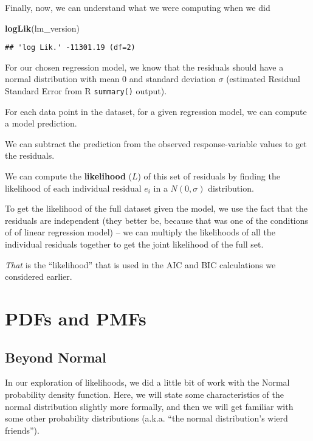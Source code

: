 \documentclass[]{book}
\newenvironment{Shaded}{\begin{snugshade}}{\end{snugshade}}
\newcommand{\KeywordTok}[1]{\textcolor[rgb]{0.13,0.29,0.53}{\textbf{#1}}}
\newcommand{\NormalTok}[1]{#1}
\begin{document}
Finally, now, we can understand what we were computing when we did

\begin{Shaded}
\begin{Highlighting}[]
\KeywordTok{logLik}\NormalTok{(lm_version)}
\end{Highlighting}
\end{Shaded}

\begin{verbatim}
## 'log Lik.' -11301.19 (df=2)
\end{verbatim}

For our chosen regression model, we know that the residuals should have a normal distribution with mean 0 and standard deviation \(\sigma\) (estimated Residual Standard Error from R \texttt{summary()} output).

For each data point in the dataset, for a given regression model, we can compute a model prediction.

We can subtract the prediction from the observed response-variable values to get the residuals.

We can compute the \textbf{likelihood} (\(L\)) of this set of residuals by finding the likelihood of each individual residual \(e_i\) in a \(N(0, \sigma)\) distribution.

To get the likelihood of the full dataset given the model, we use the fact that the residuals are independent (they better be, because that was one of the conditions of of linear regression model) -- we can multiply the likelihoods of all the individual residuals together to get the joint likelihood of the full set.

\emph{That} is the ``likelihood'' that is used in the AIC and BIC calculations we considered earlier.

\hypertarget{pdfs-and-pmfs}{%
\chapter{PDFs and PMFs}\label{pdfs-and-pmfs}}

\hypertarget{beyond-normal}{%
\section{Beyond Normal}\label{beyond-normal}}

In our exploration of likelihoods, we did a little bit of work with the Normal probability density function. Here, we will state some characteristics of the normal distribution slightly more formally, and then we will get familiar with some other probability distributions (a.k.a. ``the normal distribution's wierd friends'').
\end{document}

